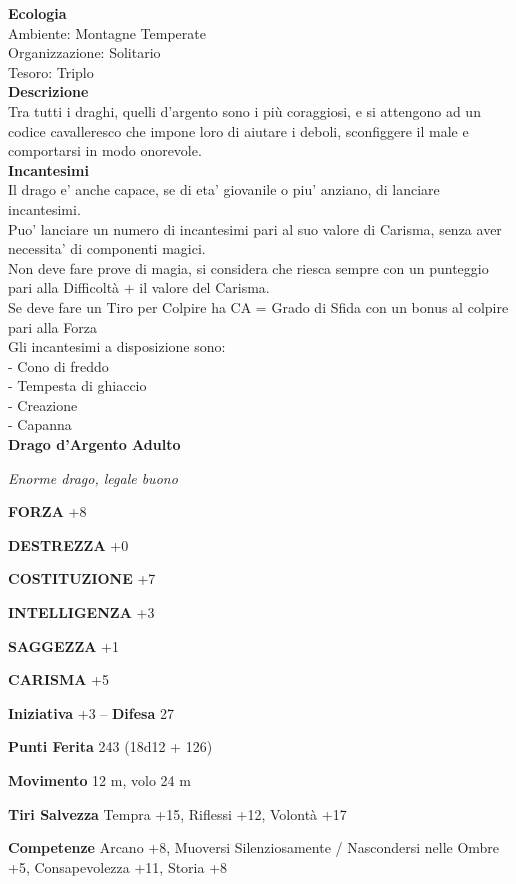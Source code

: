 \begin{multicols}{2}
\textbf{Ecologia}\\
Ambiente: Montagne Temperate\\
Organizzazione: Solitario\\
Tesoro: Triplo\\
\textbf{Descrizione}\\
Tra tutti i draghi, quelli d'argento sono i più coraggiosi, e si attengono ad un codice cavalleresco che impone loro di aiutare i deboli, sconfiggere il male e comportarsi in modo onorevole.\\
\textbf{Incantesimi}\\
Il drago e' anche capace, se di eta' giovanile o piu' anziano, di lanciare incantesimi.\\
Puo' lanciare un numero di incantesimi pari al suo valore di Carisma, senza aver necessita' di componenti magici.\\
Non deve fare prove di magia, si considera che riesca sempre con un punteggio pari alla Difficoltà + il valore del Carisma.\\
Se deve fare un Tiro per Colpire ha CA = Grado di Sfida con un bonus al colpire pari alla Forza\\
Gli incantesimi a disposizione sono:\\
- Cono di freddo\\
- Tempesta di ghiaccio\\
- Creazione\\
- Capanna\\

\medskip{}\textbf{Drago d'Argento Adulto}

\emph{Enorme drago, legale buono}

\textbf{FORZA} +8

\textbf{DESTREZZA} +0

\textbf{COSTITUZIONE} +7

\textbf{INTELLIGENZA} +3

\textbf{SAGGEZZA} +1

\textbf{CARISMA} +5

\textbf{Iniziativa} +3 -- \textbf{Difesa} 27

\textbf{Punti Ferita} 243 (18d12 + 126)

\textbf{Movimento} 12 m, volo 24 m

\textbf{Tiri Salvezza} Tempra +15, Riflessi +12, Volontà +17

\textbf{Competenze} Arcano +8, Muoversi Silenziosamente / Nascondersi nelle Ombre +5, Consapevolezza +11, Storia +8


\end{multicols}
